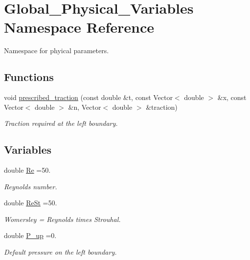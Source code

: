 \hypertarget{namespaceGlobal__Physical__Variables}{}\section{Global\+\_\+\+Physical\+\_\+\+Variables Namespace Reference}
\label{namespaceGlobal__Physical__Variables}


Namespace for phyical parameters.  


\subsection*{Functions}
\begin{DoxyCompactItemize}
\item 
void \hyperlink{namespaceGlobal__Physical__Variables_a0de42ee6d39e85c77c16a04c3a05f7a2}{prescribed\+\_\+traction} (const double \&t, const Vector$<$ double $>$ \&x, const Vector$<$ double $>$ \&n, Vector$<$ double $>$ \&traction)
\begin{DoxyCompactList}\small\item\em Traction required at the left boundary. \end{DoxyCompactList}\end{DoxyCompactItemize}
\subsection*{Variables}
\begin{DoxyCompactItemize}
\item 
double \hyperlink{namespaceGlobal__Physical__Variables_ab814e627d2eb5bc50318879d19ab16b9}{Re} =50.
\begin{DoxyCompactList}\small\item\em Reynolds number. \end{DoxyCompactList}\item 
double \hyperlink{namespaceGlobal__Physical__Variables_a085ee4bf968ffdd01a41b8c41864f907}{Re\+St} =50.
\begin{DoxyCompactList}\small\item\em Womersley = Reynolds times Strouhal. \end{DoxyCompactList}\item 
double \hyperlink{namespaceGlobal__Physical__Variables_ae1a493695b7f4619af32f405b0b28861}{P\+\_\+up} =0.
\begin{DoxyCompactList}\small\item\em Default pressure on the left boundary. \end{DoxyCompactList}\end{DoxyCompactItemize}


